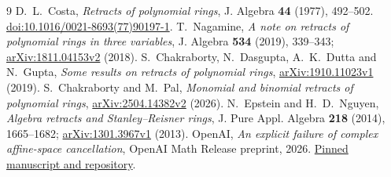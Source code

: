 \documentclass[11pt]{article}
\begin{document}
\begin{thebibliography}{9}
 D.~L.~Costa, \emph{Retracts of polynomial rings},
J. Algebra \textbf{44} (1977), 492--502.
\href{https://doi.org/10.1016/0021-8693(77)90197-1}{doi:10.1016/0021-8693(77)90197-1}.
 T.~Nagamine, \emph{A note on retracts of polynomial
rings in three variables}, J. Algebra \textbf{534} (2019), 339--343;
\href{https://arxiv.org/abs/1811.04153v2}{arXiv:1811.04153v2} (2018).
 S.~Chakraborty, N.~Dasgupta, A.~K.~Dutta and N.~Gupta,
\emph{Some results on retracts of polynomial rings},
\href{https://arxiv.org/abs/1910.11023v1}{arXiv:1910.11023v1} (2019).
 S.~Chakraborty and M.~Pal, \emph{Monomial and binomial
retracts of polynomial rings},
\href{https://arxiv.org/abs/2504.14382v2}{arXiv:2504.14382v2} (2026).
 N.~Epstein and H.~D.~Nguyen, \emph{Algebra retracts and
Stanley--Reisner rings}, J. Pure Appl. Algebra \textbf{218} (2014),
1665--1682; \href{https://arxiv.org/abs/1301.3967v1}{arXiv:1301.3967v1} (2013).
 OpenAI, \emph{An explicit failure of complex affine-space
cancellation}, OpenAI Math Release preprint, 2026.
\href{https://github.com/openai/math/blob/adc7f1241b42e322a6451854ab7e4b4c146bf78a/preprints/An-explicit-failure-of-complex-affine-space-cancellation-September-23-2026/paper.pdf}{Pinned manuscript and repository}.
\end{thebibliography}
\end{document}
